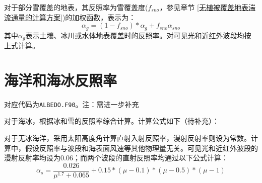 对于部分雪覆盖的地表，其反照率为雪覆盖度($f_{sno}$，参见章节 \ref{无植被覆盖地表湍流通量的计算方案})的加权函数，表示为：
\begin{equation}
\alpha_{g}=\left(1-f_{sno}\right) * \alpha_{g}+f_{sno} \alpha_{sno}
\end{equation}
其中$\alpha_{g}$表示土壤、冰川或水体地表覆盖时的反照率。对可见光和近红外波段均按上式计算。

\section{海洋和海冰反照率}\label{海洋和海冰反照率}
对应代码为\texttt{ALBEDO.F90}。注：需进一步补充

对于海冰，根据冰和雪的反照率综合计算。计算公式如下（待补充）：

对于无冰海洋，采用太阳高度角计算直射入射反照率，漫射反射率则设为常数。计算中，假设反照率与波段和海表面风速等其他物理量无关。可见光和近红外波段的漫射反射率均设为0.06；而两个波段的直射反照率均通过以下公式计算：
\begin{equation}
\alpha_{s}= \frac{0.026}{\mu^{1.7}+0.065}+0.15*(\mu-0.1)*(\mu-0.5)*(\mu-1) 
\end{equation}

